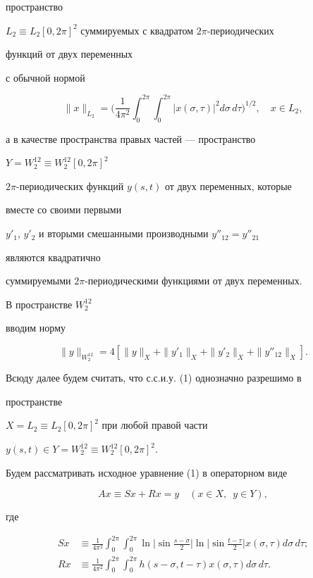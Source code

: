 пространство 


$L_2\equiv L_2[0,2\pi]^2$ суммируемых с квадратом $2\pi$-периодических 


функций от двух переменных 


с обычной нормой 


$$ 


\|x\|_{L_2}=\bigg(\frac{1}{4\pi^2}\int^{2\pi}_0\int^{2\pi}_0 


|x(\sigma,\tau)|^2d\sigma\,d\tau 


\bigg)^{1/2},\quad x\in L_2, 


$$ 


а в качестве пространства правых частей --- пространство 


$Y=W^{12}_2\equiv W^{12}_2[0,2\pi]^2$\; 


$2\pi$-перио\-дических функций $y(s,t)$ от двух переменных, которые 


вместе со своими первыми 


$y'_1$, $y'_2$ и вторыми смешанными производными $y''_{12}=y''_{21}$ 


являются квадратично 


суммируемыми $2\pi$-периодическими функциями от двух переменных. 


В пространстве $W^{12}_2$ 


вводим норму 


$$ 


\|y\|_{W^{12}_2}=4[\|y\|_X+\|y'_1\|_X+ 


\|y'_2\|_X+\|y''_{12}\|_X]. 


$$ 


 


Всюду далее будем считать, что с.с.и.у. (1) однозначно разрешимо в 


пространстве 


$X=L_2\equiv L_2[0,2\pi]^2$ при любой правой части 


$y(s,t)\in Y=W^{12}_2\equiv W^{12}_2[0,2\pi]^2$. 


 


Будем рассматривать исходное уравнение (1) в операторном виде 


$$ 


A x\equiv S x+R x=y\quad(x\in X,\ \; y\in Y), 


$$ 


где 


\begin{align*} 


S x&\equiv\frac{1}{4\pi^2}\int^{2\pi}_0\int^{2\pi}_0 


\ln\bigg|\sin\frac{s-\sigma}{2}\bigg|\ln\bigg|\sin 


\frac{t-\tau}{2}\bigg|x(\sigma,\tau)d\sigma\,d\tau;\\ 


R x&\equiv\frac{1}{4\pi^2}\int^{2\pi}_0\int^{2\pi}_0 


h(s-\sigma,t-\tau)x(\sigma,\tau)d\sigma\,d\tau. 


\end{align*} 


